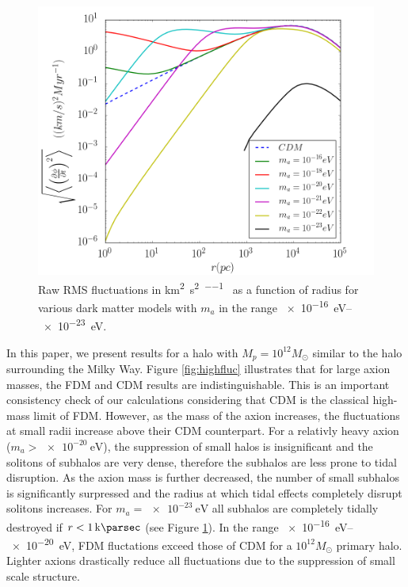 \documentclass[usenatbib]{mnras}
\newcommand{\poweV}[1]{\SI{e#1}{\electronvolt}}
\begin{document}
\begin{figure}
\includegraphics[width=\columnwidth]{Fluctuations.png}
\vspace*{-5mm}
\caption{Raw RMS fluctuations in \si{\kilo\metre\squared\per\second\squared\per\mega\year} as a function of radius for various dark matter models with $m_a$ in the range \SIrange{e-16}{e-23}{\electronvolt}.}
\label{fig:normfluc}
\end{figure}


\par
	In this paper, we present results for a halo with $M_p = 10^{12} M_{\odot}$ similar to the halo surrounding the Milky Way. Figure \ref{fig:highfluc} illustrates that for large axion masses, the FDM and CDM results are indistinguishable. This is an important consistency check of our calculations considering that CDM is the classical high-mass limit of FDM. However, as the mass of the axion increases, the fluctuations at small radii increase above their CDM counterpart. For a relativly heavy axion ($m_a > \poweV{-20}$), the suppression of small halos is insignificant and the solitons of subhalos are very dense, therefore the subhalos are less prone to tidal disruption. As the axion mass is further decreased, the number of small subhalos is significantly surpressed and the radius at which tidal effects completely disrupt solitons increases. For $m_a = \poweV{-23}$ all subhalos are completely tidally destroyed if $r < \SI{1}{\kilo\parsec}$ (see Figure \ref{fig:normfluc}). In the range \SIrange{e-16}{e-20}{\electronvolt}, FDM fluctations exceed those of CDM for a $10^{12} M_{\odot}$ primary halo. Lighter axions drastically reduce all fluctuations due to the suppression of small scale structure.  
\end{document}
